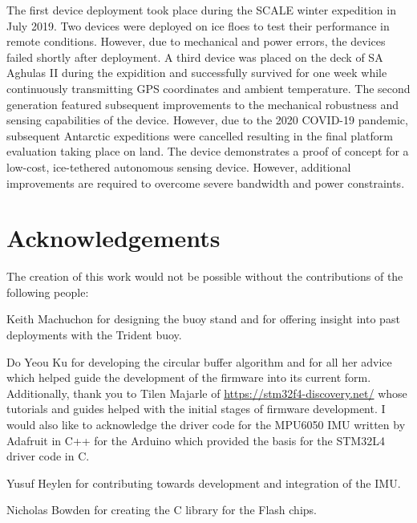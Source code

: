 \documentclass[a4paper, 12pt, oneside, openright, parskip=full]{book}
\begin{document}
The first device deployment took place during the SCALE winter expedition in July 2019. Two devices were deployed on ice floes to test their performance in remote conditions. However, due to mechanical and power errors, the devices failed shortly after deployment. A third device was placed on the deck of SA Aghulas II during the expidition and successfully survived for one week while continuously transmitting GPS coordinates and ambient temperature. The second generation featured subsequent improvements to the mechanical robustness and sensing capabilities of the device. However, due to the 2020 COVID-19 pandemic, subsequent Antarctic expeditions were cancelled resulting in the final platform evaluation taking place on land. The device demonstrates a proof of concept for a low-cost, ice-tethered autonomous sensing device. However, additional improvements are required to overcome severe bandwidth and power constraints.
\chapter{Acknowledgements}		
\label{ch:ack}


The creation of this work would not be possible without the contributions of the following people:

Keith Machuchon for designing the buoy stand and for offering insight into past deployments with the Trident buoy.

Do Yeou Ku for developing the circular buffer algorithm and for all her advice which helped guide the development of the firmware into its current form.  Additionally, thank you to Tilen Majarle of \url{https://stm32f4-discovery.net/} whose tutorials and guides helped with the initial stages of firmware development. I would also like to acknowledge the driver code for the MPU6050 IMU written by Adafruit in C++ for the Arduino which provided the basis for the STM32L4 driver code in C.
 
Yusuf Heylen for contributing towards development and integration of the IMU.

Nicholas Bowden for creating the C library for the Flash chips.
\end{document}
